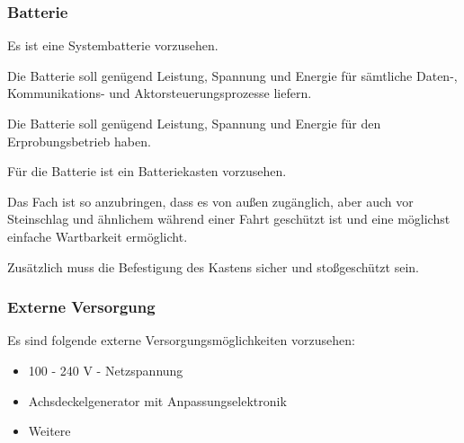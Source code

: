 \subsubsection{Batterie}
\begin{feat}
Es ist eine Systembatterie vorzusehen.
\end{feat}
\begin{rem}[zu Anf. 10]
Die Batterie soll genügend Leistung, Spannung und Energie für sämtliche Daten-, Kommunikations- und Aktorsteuerungsprozesse liefern.
\end{rem}
\begin{rem}[zu Anf. 10]
Die Batterie soll genügend Leistung, Spannung und Energie für den Erprobungsbetrieb haben.
\end{rem}
\begin{feat}
Für die Batterie ist ein Batteriekasten vorzusehen. 
\end{feat}
\begin{rem} [zu Anf. 11]
Das Fach ist so anzubringen, dass es von außen zugänglich, aber auch vor Steinschlag und ähnlichem während einer Fahrt geschützt ist und eine möglichst einfache Wartbarkeit ermöglicht.
\end{rem}
\begin{rem}
Zusätzlich muss die Befestigung des Kastens sicher und stoßgeschützt sein.
\end{rem}

\subsubsection{Externe Versorgung}
\begin{feat}
Es sind folgende externe Versorgungsmöglichkeiten vorzusehen:
\begin{itemize}
    \item 100 - 240 V - Netzspannung
    \item Achsdeckelgenerator mit Anpassungselektronik
    \item Weitere
\end{itemize}
\end{feat}


